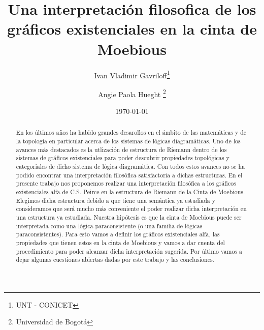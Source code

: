 \documentclass[
	fontsize=10pt, %
	twoside=true, %
	secnumdepth=1, %
	abstract=true, %
]{kaohandt}
\begin{document}

\title[Una interpretación filosofica de los gráficos existenciales en la cinta de Moebious]{Una interpretación filosofica de los gráficos existenciales en la cinta de Moebious}

\author[IVG, APH]{Ivan Vladimir Gavriloff\thanks{UNT - CONICET} \and Angie Paola Hueght \thanks{Universidad de Bogotá}}

\date{\today}


\maketitle

\margintoc

\begin{abstract}
	\noindent
	En los últimos años ha habido grandes desarollos en el ámbito de las matemáticas y de la topología en particular acerca de los sistemas de lógicas diagramáticas. Uno de los avances más destacados es la utlización de estructura de Riemann dentro de los sistemas de gráficos existenciales para poder descubrir propiedades topológicas y categoriales de dicho sistema de lógica diagramática. Con todos estos avances no se ha podido encontrar una interpretación filosófica satisfactoria a dichas estructuras.
	En el presente trabajo nos proponemos realizar una interpretación filosófica a los gráficos existenciales alfa de C.S. Peirce en la estructura de Riemann de la Cinta de Moebious. Elegimos dicha estructura debido a que tiene una semántica ya estudiada y consideramos que será mucho más conveniente el poder realizar dicha interpretación en una estructura ya estudiada. Nuestra hipótesis es que la cinta de Moebious puede ser interpretada como una lógica paraconsistente (o una familia de lógicas paraconsistentes). Para esto vamos a definir los gráficos existenciales alfa, las propiedades que tienen estos en la cinta de Moebious y vamos a dar cuenta del procedimiento para poder alcanzar dicha interpretación sugerida. Por último vamos a dejar algunas cuestiones abiertas dadas por este trabajo y las conclusiones.
\end{abstract}
\end{document}
